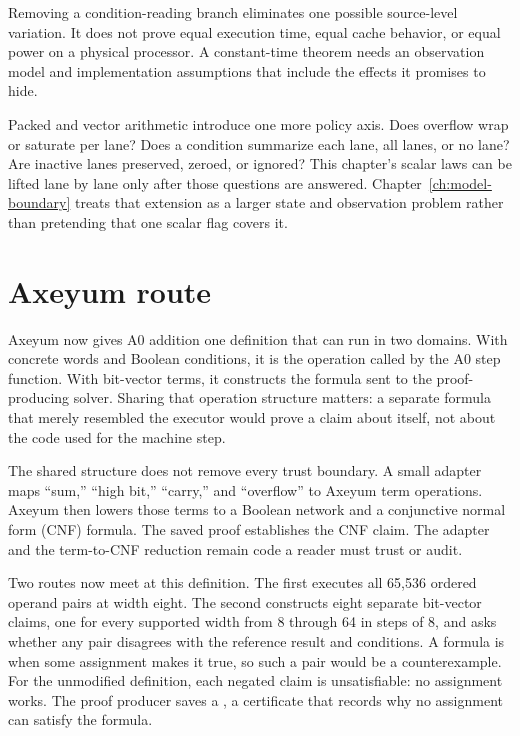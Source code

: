\begin{warning}[title={Branch-free is not a complete constant-time claim}]
Removing a condition-reading branch eliminates one possible source-level
variation. It does not prove equal execution time, equal cache behavior, or
equal power on a physical processor. A constant-time theorem needs an
observation model and implementation assumptions that include the effects it
promises to hide.
\end{warning}

Packed and vector arithmetic introduce one more policy axis. Does overflow
wrap or saturate per lane? Does a condition summarize each lane, all lanes, or
no lane? Are inactive lanes preserved, zeroed, or ignored? This chapter's
scalar laws can be lifted lane by lane only after those questions are answered.
Chapter~\ref{ch:model-boundary} treats that extension as a larger state and
observation problem rather than pretending that one scalar flag covers it.

\section{Axeyum route}

Axeyum now gives A0 addition one definition that can run in two domains. With
concrete words and Boolean conditions, it is the operation called by the A0
step function. With bit-vector terms, it constructs the formula sent to the
proof-producing solver. Sharing that operation structure matters: a separate
formula that merely resembled the executor would prove a claim about itself,
not about the code used for the machine step.

The shared structure does not remove every trust boundary. A small adapter
maps ``sum,'' ``high bit,'' ``carry,'' and ``overflow'' to Axeyum term
operations. Axeyum then lowers those terms to a Boolean network and a
conjunctive normal form (CNF) formula. The saved proof establishes the CNF
claim. The adapter and the term-to-CNF reduction remain code a reader must
trust or audit.

Two routes now meet at this definition. The first executes all 65,536 ordered
operand pairs at width eight. The second constructs eight separate bit-vector
claims, one for every supported width from 8 through 64 in steps of 8, and
asks whether any pair disagrees with the reference result and conditions. A
formula is  when some assignment makes it true, so such a
pair would be a counterexample. For the unmodified definition, each negated
claim is unsatisfiable: no assignment works. The proof producer saves a
, a certificate that records why no assignment can satisfy
the formula.

